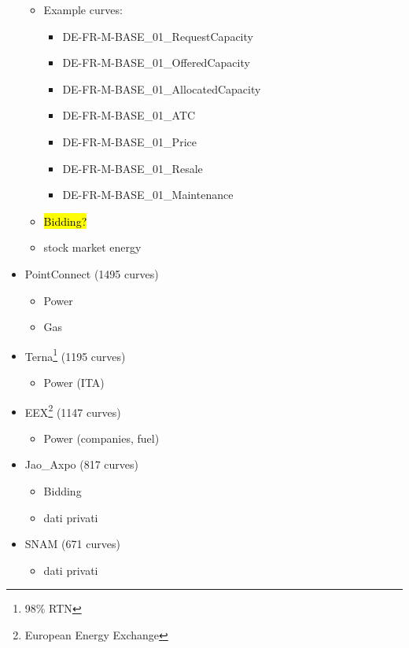 \begin{itemize}
        \begin{itemize}
            \item Example curves:
                \begin{itemize}
                    \item DE-FR-M-BASE\_01\_RequestCapacity
                    \item DE-FR-M-BASE\_01\_OfferedCapacity
                    \item DE-FR-M-BASE\_01\_AllocatedCapacity
                    \item DE-FR-M-BASE\_01\_ATC
                    \item DE-FR-M-BASE\_01\_Price
                    \item DE-FR-M-BASE\_01\_Resale
                    \item DE-FR-M-BASE\_01\_Maintenance
                \end{itemize}
            \item \hl{Bidding?}
            \item stock market energy
        \end{itemize}
    \item PointConnect (1495 curves)
        \begin{itemize}
            \item Power
            \item Gas
        \end{itemize}
    \item Terna\footnote{98\% RTN} (1195 curves)
        \begin{itemize}
            \item Power (ITA)
        \end{itemize}
    \item EEX\footnote{European Energy Exchange} (1147 curves)
        \begin{itemize}
            \item Power (companies, fuel)
        \end{itemize}
    \item Jao\_Axpo (817 curves)
        \begin{itemize}
            \item Bidding
            \item dati privati
        \end{itemize}
    \item SNAM (671 curves)
        \begin{itemize}
            \item dati privati

\end{itemize}
\end{itemize}
